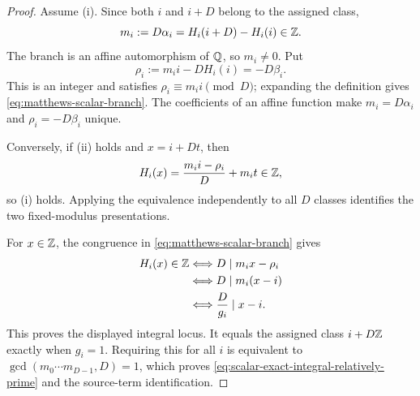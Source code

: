 \begin{proof}
Assume (i).  Since both $i$ and $i+D$ belong to the assigned class,
\[
 m_i:=D\alpha_i=H_i(i+D)-H_i(i)\in\mathbb Z.
\]
The branch is an affine automorphism of $\mathbb Q$, so $m_i\ne0$.  Put
\[
 \rho_i:=m_i i-DH_i(i)=-D\beta_i.
\]
This is an integer and satisfies
$\rho_i\equiv m_i i\pmod D$; expanding the definition gives
\cref{eq:matthews-scalar-branch}.  The coefficients of an affine function
make $m_i=D\alpha_i$ and $\rho_i=-D\beta_i$ unique.

Conversely, if (ii) holds and $x=i+Dt$, then
\[
 H_i(x)=\frac{m_i i-\rho_i}{D}+m_it\in\mathbb Z,
\]
  so (i) holds.  Applying the equivalence independently to all $D$ classes
identifies the two fixed-modulus presentations.

For $x\in\mathbb Z$, the congruence in
\cref{eq:matthews-scalar-branch} gives
\begin{align*}
 H_i(x)\in\mathbb Z
 &\Longleftrightarrow D\mid m_i x-\rho_i\\
 &\Longleftrightarrow D\mid m_i(x-i)\\
 &\Longleftrightarrow \frac{D}{g_i}\mid x-i.
\end{align*}
This proves the displayed integral locus.  It equals the assigned class
$i+D\mathbb Z$ exactly when $g_i=1$.  Requiring this for all $i$ is equivalent to
$\gcd(m_0\cdots m_{D-1},D)=1$, which proves
\cref{eq:scalar-exact-integral-relatively-prime} and the source-term
identification.
\end{proof}


